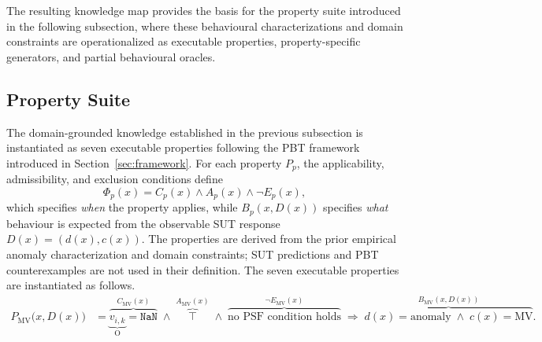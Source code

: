 \documentclass[preprint,12pt]{elsarticle}
\begin{document}
The resulting knowledge map provides the basis for the property suite
introduced in the following subsection, where these behavioural
characterizations and domain constraints are operationalized as executable
properties, property-specific generators, and partial behavioural oracles.


\subsection{Property Suite}
\label{sec:property_suite}

The domain-grounded knowledge established in the previous subsection is
instantiated as seven executable properties following the PBT framework
introduced in Section~\ref{sec:framework}. For each property \(P_p\), the
applicability, admissibility, and exclusion conditions define
\[
\Phi_p(x)=C_p(x)\land A_p(x)\land\neg E_p(x),
\]
which specifies \emph{when} the property applies, while \(B_p(x,D(x))\)
specifies \emph{what} behaviour is expected from the observable SUT response
\(D(x)=(d(x),c(x))\). The properties are derived from the prior empirical
anomaly characterization and domain constraints; SUT predictions and PBT
counterexamples are not used in their definition. The seven executable properties are
instantiated as follows.
\begingroup
\scriptsize
\begin{equation}
\begin{aligned}
P_{\mathrm{MV}}\bigl(x,D(x)\bigr)
&=
\overbrace{
    \underbrace{v_{i,k}}_{\mathrm{O}}=\texttt{NaN}
}^{C_{\mathrm{MV}}(x)}
\;\land\;
\overbrace{
    \top
}^{A_{\mathrm{MV}}(x)}
\;\land\;
\overbrace{
    \text{no PSF condition holds}
}^{\neg E_{\mathrm{MV}}(x)}
\;\Rightarrow\;
\overbrace{
    d(x)=\mathrm{anomaly}
    \;\land\;
    c(x)=\mathrm{MV}
}^{B_{\mathrm{MV}}(x,D(x))}.
\end{aligned}
\label{eq:property_mv}
\end{equation}
\endgroup
\end{document}
